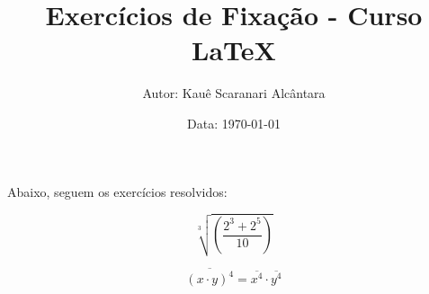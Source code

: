 \documentclass[a4paper, 12pt]{article}
\title{{\LARGE \textbf{Exercícios de Fixação - Curso LaTeX}}}
\author{Autor: Kauê Scaranari Alcântara}
\date{Data: \today}
\begin{document}
\maketitle
Abaixo, seguem os exercícios resolvidos:

\begin{equation}
\sqrt[3]{\left(\frac{2^{3} + 2^{5}}{10}\right)}
\end{equation}

\begin{equation}
\overline{(x \cdot y)^{4}} = \overline{x^{4}} \cdot \overline{y^{4}}
\end{equation}
\end{document}

